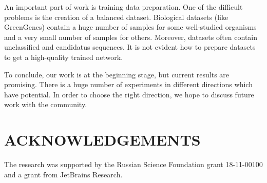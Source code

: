 \documentclass[a4paper,twoside]{article}
\begin{document}
An important part of work is training data preparation.
One of the difficult problems is the creation of a balanced dataset.
Biological datasets (like GreenGenes) contain a huge number of samples for some well-studied organisms and a very small number of samples for others.
Moreover, datasets often contain unclassified and candidatus sequences.
It is not evident how to prepare datasets to get a high-quality trained network.

To conclude, our work is at the beginning stage, but current results are promising. 
There is a huge number of experiments in different directions which have potential.
In order to choose the right direction, we hope to discuss future work with the community.


\section*{\uppercase{Acknowledgements}}

\noindent The research was supported by the Russian Science Foundation grant 18-11-00100 and a grant from JetBrains Research.




{\small
}


\vfill
\end{document}
